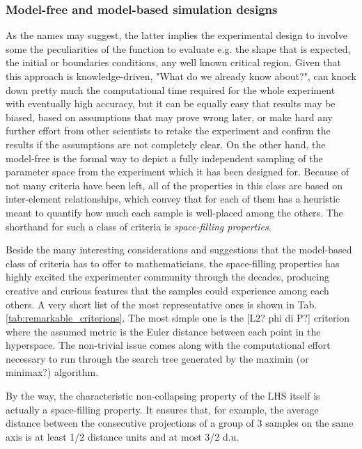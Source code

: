 \documentclass[12pt]{extarticle}
\newcommand{\mtabref}[1]{Tab.\ref{#1}}
\newcommand{\midcaption}[1]{
    \captionsetup{justification=centering}
    \caption{#1}
}
\begin{document}
\begin{figure}[h]
	\midcaption{}
    \label{fig:latin_square}
\end{figure}

\subsubsection{Model-free and model-based simulation designs}
\label{subsubsec:model_free_model_based}
As the names may suggest, the latter implies the experimental design to involve some the peculiarities of the function to evaluate e.g. the shape that is expected, the initial or boundaries conditions, any well known critical region. Given that this approach is knowledge-driven, "What do we already know about?", can knock down pretty much the computational time required for the whole experiment with eventually high accuracy, but it can be equally easy that results may be biased, based on assumptions that may prove wrong later, or make hard any further effort from other scientists to retake the experiment and confirm the results if the assumptions are not completely clear.
On the other hand, the model-free is the formal way to depict a fully independent sampling of the parameter space from the experiment which it has been designed for. Because of not many criteria have been left, all of the properties in this class are based on inter-element relationships, which convey that for each of them has a heuristic meant to quantify how much each sample is well-placed among the others. The shorthand for such a class of criteria is \textit{space-filling properties}.

Beside the many interesting considerations and suggestions that the model-based class of criteria has to offer to mathematicians, the space-filling properties has highly excited the experimenter community through the decades, producing creative and curious features that the samples could experience among each others. A very short list of the most representative ones is shown in \mtabref{tab:remarkable_criterions}. The most simple one is the [L2? phi di P?] criterion where the assumed metric is the Euler distance between each point in the hyperspace. The non-trivial issue comes along with the computational effort necessary to run through the search tree generated by the maximin (or minimax?) algorithm.

By the way, the characteristic non-collapsing property of the LHS itself is actually a space-filling property. It ensures that, for example, the average distance between the consecutive projections of a group of 3 samples on the same axis is at least 1/2 distance units and at most 3/2 d.u.
\end{document}
